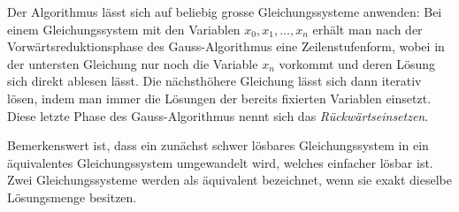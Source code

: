 Der Algorithmus lässt sich auf beliebig grosse Gleichungssysteme anwenden:
Bei einem Gleichungssystem mit den Variablen $x_{0}, x_{1}, \dots, x_{n}$ erhält man nach der Vorwärtsreduktionsphase des Gauss-Algorithmus eine Zeilenstufenform,
wobei in der untersten Gleichung nur noch die Variable $x_{n}$ vorkommt und deren Lösung sich direkt ablesen lässt.
Die nächsthöhere Gleichung lässt sich dann iterativ lösen, indem man immer die Lösungen der bereits fixierten Variablen einsetzt.
Diese letzte Phase des Gauss-Algorithmus nennt sich das \emph{Rückwärtseinsetzen}.

Bemerkenswert ist, dass ein zunächst schwer lösbares Gleichungssystem in ein äquivalentes Gleichungssystem umgewandelt wird, welches einfacher lösbar ist.
Zwei Gleichungssysteme werden als äquivalent bezeichnet, wenn sie exakt dieselbe Lösungsmenge besitzen.
